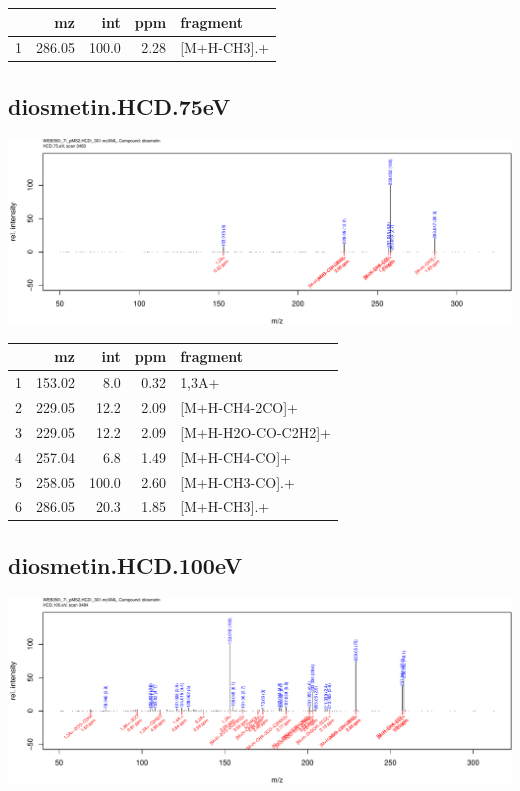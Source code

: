 \documentclass[]{article}
\begin{document}
\begin{table}[ht]
\centering
\begin{tabular}{rrrrl}
  \toprule
 & mz & int & ppm & fragment \\ 
  \midrule
1 & 286.05 & 100.0 & 2.28 & [M+H-CH3].+ \\ 
   \bottomrule
\end{tabular}
\end{table}

\clearpage\subsection{diosmetin.HCD.75eV}
\includegraphics[width=\textwidth]{WEB350_files/figure-latex/unnamed-chunk-3-20}

\begin{table}[ht]
\centering
\begin{tabular}{rrrrl}
  \toprule
 & mz & int & ppm & fragment \\ 
  \midrule
1 & 153.02 & 8.0 & 0.32 & 1,3A+ \\ 
  2 & 229.05 & 12.2 & 2.09 & [M+H-CH4-2CO]+ \\ 
  3 & 229.05 & 12.2 & 2.09 & [M+H-H2O-CO-C2H2]+ \\ 
  4 & 257.04 & 6.8 & 1.49 & [M+H-CH4-CO]+ \\ 
  5 & 258.05 & 100.0 & 2.60 & [M+H-CH3-CO].+ \\ 
  6 & 286.05 & 20.3 & 1.85 & [M+H-CH3].+ \\ 
   \bottomrule
\end{tabular}
\end{table}

\clearpage\subsection{diosmetin.HCD.100eV}
\includegraphics[width=\textwidth]{WEB350_files/figure-latex/unnamed-chunk-3-21}
\end{document}
